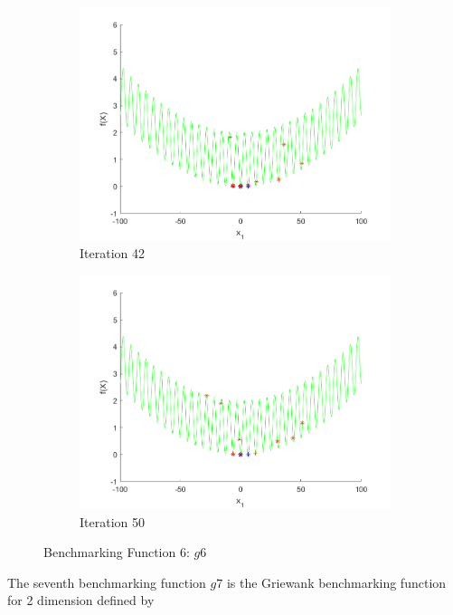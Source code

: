 \begin{figure}
\begin{subfigure}[b]{0.4\textwidth}
   \includegraphics[width=\textwidth]{img/smpl/grwnk1d/loa-iter-42}
   \caption{Iteration 42}
   \label{fig:s6-iter-6}
 \end{subfigure}
 \begin{subfigure}[b]{0.4\textwidth}
   \includegraphics[width=\textwidth]{img/smpl/grwnk1d/loa-iter-50}
   \caption{Iteration 50}
   \label{fig:s6-iter-7}
 \end{subfigure}
 \caption{Benchmarking Function 6: $g6$}
\end{figure}

\par The seventh benchmarking function $g7$ is the Griewank benchmarking function for 2 dimension defined by

